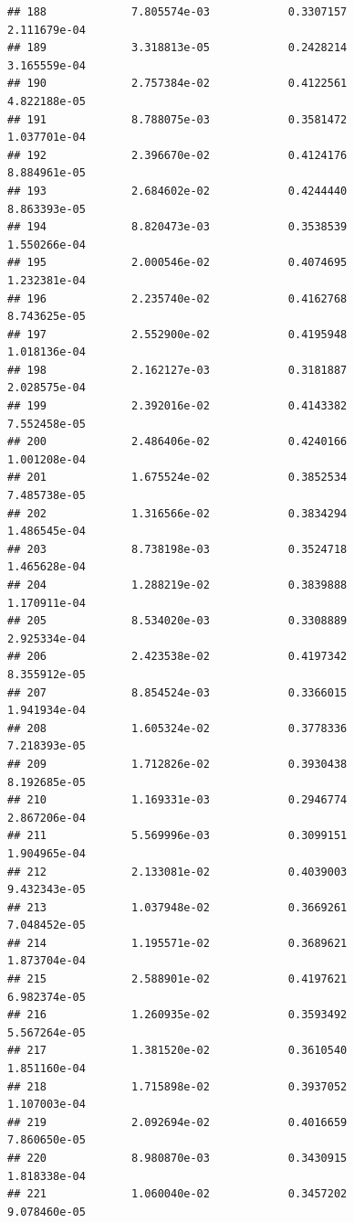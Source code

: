 \documentclass[
]{article}
\begin{document}
\begin{verbatim}
## 188             7.805574e-03            0.3307157            2.111679e-04
## 189             3.318813e-05            0.2428214            3.165559e-04
## 190             2.757384e-02            0.4122561            4.822188e-05
## 191             8.788075e-03            0.3581472            1.037701e-04
## 192             2.396670e-02            0.4124176            8.884961e-05
## 193             2.684602e-02            0.4244440            8.863393e-05
## 194             8.820473e-03            0.3538539            1.550266e-04
## 195             2.000546e-02            0.4074695            1.232381e-04
## 196             2.235740e-02            0.4162768            8.743625e-05
## 197             2.552900e-02            0.4195948            1.018136e-04
## 198             2.162127e-03            0.3181887            2.028575e-04
## 199             2.392016e-02            0.4143382            7.552458e-05
## 200             2.486406e-02            0.4240166            1.001208e-04
## 201             1.675524e-02            0.3852534            7.485738e-05
## 202             1.316566e-02            0.3834294            1.486545e-04
## 203             8.738198e-03            0.3524718            1.465628e-04
## 204             1.288219e-02            0.3839888            1.170911e-04
## 205             8.534020e-03            0.3308889            2.925334e-04
## 206             2.423538e-02            0.4197342            8.355912e-05
## 207             8.854524e-03            0.3366015            1.941934e-04
## 208             1.605324e-02            0.3778336            7.218393e-05
## 209             1.712826e-02            0.3930438            8.192685e-05
## 210             1.169331e-03            0.2946774            2.867206e-04
## 211             5.569996e-03            0.3099151            1.904965e-04
## 212             2.133081e-02            0.4039003            9.432343e-05
## 213             1.037948e-02            0.3669261            7.048452e-05
## 214             1.195571e-02            0.3689621            1.873704e-04
## 215             2.588901e-02            0.4197621            6.982374e-05
## 216             1.260935e-02            0.3593492            5.567264e-05
## 217             1.381520e-02            0.3610540            1.851160e-04
## 218             1.715898e-02            0.3937052            1.107003e-04
## 219             2.092694e-02            0.4016659            7.860650e-05
## 220             8.980870e-03            0.3430915            1.818338e-04
## 221             1.060040e-02            0.3457202            9.078460e-05

\end{verbatim}
\end{document}
